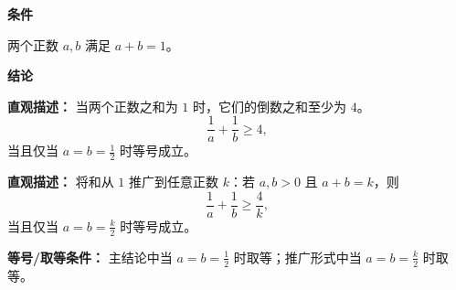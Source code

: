 \begin{statementbox}

	\textbf{\textcolor{CStatement}{条件}}
	\begin{description}[style=nextline, leftmargin=2.8em, labelsep=0.5em, itemsep=0.35em]
		\item[\textbf{\textcolor{CStatement}{条件 1（和为定值）：}}] 两个正数 $a,b$ 满足 $a+b = 1$。
	\end{description}

	\textbf{\textcolor{CStatement}{结论}}
	\begin{description}[style=nextline, leftmargin=2.8em, labelsep=0.5em, itemsep=0.45em]
		\item[\textbf{\textcolor{CStatement}{结论一（倒数和不小）：}}]
			\textbf{\textcolor{CStatement}{直观描述：}}
			当两个正数之和为 $1$ 时，它们的倒数之和至少为 $4$。
			\[
				\frac{1}{a}+\frac{1}{b}\geq 4,
			\]
			当且仅当 $a=b=\frac12$ 时等号成立。
		\item[\textbf{\textcolor{CStatement}{推广结论（和一般化）：}}]
			\textbf{\textcolor{CStatement}{直观描述：}}
			将和从 $1$ 推广到任意正数 $k$：若 $a,b>0$ 且 $a+b=k$，则
			\[
				\frac{1}{a}+\frac{1}{b}\geq \frac{4}{k},
			\]
			当且仅当 $a=b=\frac{k}{2}$ 时等号成立。
	\end{description}

	\textbf{\textcolor{CStatement}{等号/取等条件：}}
	主结论中当 $a=b=\frac12$ 时取等；推广形式中当 $a=b=\frac{k}{2}$ 时取等。
\end{statementbox}

